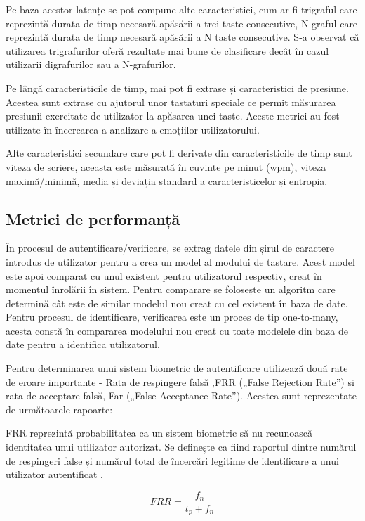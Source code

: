 \documentclass[9pt,shortpaper,twoside,web]{ieeecolor}
\begin{document}
	Pe baza acestor latențe se pot compune alte caracteristici, cum ar fi trigraful care reprezintă durata de timp necesară apăsării a trei taste consecutive, N-graful care reprezintă durata de timp necesară apăsării a N taste consecutive. S-a observat că utilizarea trigrafurilor oferă rezultate mai bune de clasificare decât în cazul utilizarii digrafurilor sau a N-grafurilor. 
		
	Pe lângă caracteristicile de timp, mai pot fi extrase și caracteristici de presiune. Acestea sunt extrase cu ajutorul unor tastaturi speciale ce permit măsurarea presiunii exercitate de utilizator la apăsarea unei taste. Aceste metrici au fost utilizate în încercarea a analizare a emoțiilor utilizatorului.

	Alte caracteristici secundare care pot fi derivate din caracteristicile de timp sunt viteza de scriere, aceasta este măsurată în cuvinte pe minut (wpm), viteza maximă/minimă, media și deviația standard a caracteristicelor și entropia.
	

\subsection{Metrici de performanță}
	În procesul de autentificare/verificare, se extrag datele din șirul de caractere introdus de utilizator pentru a crea un model al modului de tastare. Acest model este apoi comparat cu unul existent pentru utilizatorul respectiv, creat în momentul înrolării în sistem. Pentru comparare se folosește un algoritm care determină cât este de similar modelul nou creat cu cel existent în baza de date. Pentru procesul de identificare, verificarea este un proces de tip one-to-many, acesta constă în compararea modelului nou creat cu toate modelele din baza de date pentru a identifica utilizatorul.
	
	Pentru determinarea unui sistem biometric de autentificare utilizează două rate de eroare importante
- Rata de respingere falsă ,FRR („False Rejection Rate”) și rata de acceptare falsă, Far („False Acceptance Rate”). Acestea sunt reprezentate de următoarele rapoarte:


FRR reprezintă probabilitatea ca un sistem biometric să nu recunoască identitatea unui utilizator autorizat. Se definește ca fiind raportul dintre numărul de respingeri false și numărul total de încercări legitime de identificare a unui utilizator autentificat \cite{b7}.

\begin{equation} \label{eq2}
FRR = \frac{f_n}{t_p + f_n}
\end{equation}
\end{document}
